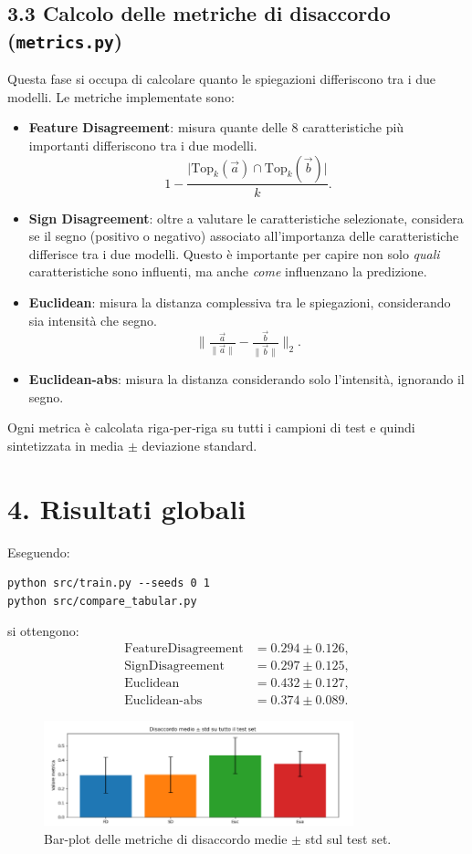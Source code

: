 \documentclass[a4paper,11pt]{article}
\begin{document}
\subsection*{3.3 Calcolo delle metriche di disaccordo (\texttt{metrics.py})}
Questa fase si occupa di calcolare quanto le spiegazioni differiscono tra i due modelli. Le metriche implementate sono:
\begin{itemize}
\item \textbf{Feature Disagreement}: misura quante delle 8 caratteristiche più importanti differiscono tra i due modelli.
  \[
  1 - \frac{\lvert\mathrm{Top}_k(\vec a)\cap \mathrm{Top}_k(\vec b)\rvert}{k}.
  \]
\item \textbf{Sign Disagreement}: oltre a valutare le caratteristiche selezionate, considera se il segno (positivo o negativo) associato all'importanza delle caratteristiche differisce tra i due modelli. Questo è importante per capire non solo \emph{quali} caratteristiche sono influenti, ma anche \emph{come} influenzano la predizione.
\item \textbf{Euclidean}: misura la distanza complessiva tra le spiegazioni, considerando sia intensità che segno.
  \[
  \|\tfrac{\vec a}{\|\vec a\|}-\tfrac{\vec b}{\|\vec b\|}\|_2.
  \]
\item \textbf{Euclidean-abs}: misura la distanza considerando solo l’intensità, ignorando il segno.
\end{itemize}
Ogni metrica è calcolata riga‐per‐riga su tutti i campioni di test e quindi sintetizzata in media \(\pm\) deviazione standard.

\section*{4. Risultati globali}
Eseguendo:
\begin{verbatim}
python src/train.py --seeds 0 1
python src/compare_tabular.py
\end{verbatim}
si ottengono: 
\[
\begin{aligned}
\text{FeatureDisagreement} &= 0.294 \pm 0.126,\\
\text{SignDisagreement}    &= 0.297 \pm 0.125,\\
\text{Euclidean}           &= 0.432 \pm 0.127,\\
\text{Euclidean-abs}       &= 0.374 \pm 0.089.
\end{aligned}
\]

\begin{figure}[htbp]
  \centering
  \includegraphics[width=0.8\textwidth]{globali.png}
  \caption{Bar-plot delle metriche di disaccordo medie $\pm$ std sul test set.}
  \label{fig:global_vs_case}
\end{figure}
\end{document}
